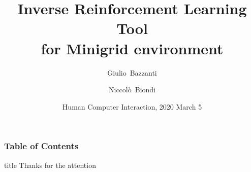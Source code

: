 \documentclass[10pt]{beamer}
\title[Inverse Reinforcement Learning Tool for Minigrid environment] %
{Inverse Reinforcement Learning Tool \\ for Minigrid environment }
\author[Giulio Bazzanti, Niccolò Biondi] %
{Giulio~Bazzanti \and Niccolò~Biondi}
\date[HCI 2020] %
{Human Computer Interaction, 2020 March 5}
\begin{document}
	
\begin{frame}[plain]
	\titlepage
	\addtocounter{framenumber}{-1}
\end{frame}

\begin{frame}[plain]
\frametitle{Table of Contents}
\tableofcontents

\addtocounter{framenumber}{-1}
\end{frame}


\begin{frame}[plain]
	\vfill
	\centering
	\begin{beamercolorbox}[sep=8pt,center,shadow=true,rounded=true]{title}
		Thanks for the attention\par%
	\end{beamercolorbox}
	\vfill
	\addtocounter{framenumber}{-1}
\end{frame}
\end{document}
